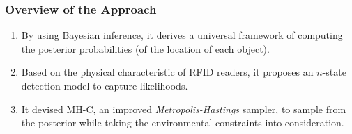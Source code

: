 
\begin{frame}
\frametitle{Overview of the Approach}

\begin{enumerate}
  \item By using Bayesian inference, it derives a universal framework of computing the posterior probabilities (of the location of each object).
  \item Based on the physical characteristic of RFID readers, it proposes an $n$-state detection model to capture likelihoods.
  \item It devised MH-C, an improved \emph{Metropolis-Hastings} sampler, to sample from the posterior while taking the environmental constraints into consideration.
\end{enumerate}

\end{frame}
